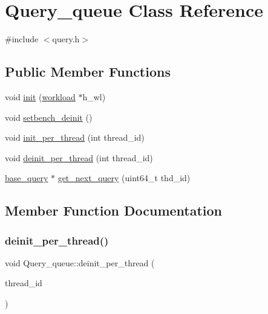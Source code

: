 \hypertarget{classQuery__queue}{}\section{Query\+\_\+queue Class Reference}
\label{classQuery__queue}


{\ttfamily \#include $<$query.\+h$>$}

\subsection*{Public Member Functions}
\begin{DoxyCompactItemize}
\item 
void \hyperlink{classQuery__queue_a7b11f8dff9c71abbf96d85328001803d}{init} (\hyperlink{classworkload}{workload} $\ast$h\+\_\+wl)
\item 
void \hyperlink{classQuery__queue_a3a8dbf987f4aac6af22083227cb30dac}{setbench\+\_\+deinit} ()
\item 
void \hyperlink{classQuery__queue_acad0797f9688fbada3f0c4748f95e2dc}{init\+\_\+per\+\_\+thread} (int thread\+\_\+id)
\item 
void \hyperlink{classQuery__queue_a3f657d30e7e04d7877e6b436aff26f38}{deinit\+\_\+per\+\_\+thread} (int thread\+\_\+id)
\item 
\hyperlink{classbase__query}{base\+\_\+query} $\ast$ \hyperlink{classQuery__queue_ac68f34bc81dc3919b5552724f82120a2}{get\+\_\+next\+\_\+query} (uint64\+\_\+t thd\+\_\+id)
\end{DoxyCompactItemize}


\subsection{Member Function Documentation}
\mbox{\label{classQuery__queue_a3f657d30e7e04d7877e6b436aff26f38}} 
\subsubsection{\texorpdfstring{deinit\+\_\+per\+\_\+thread()}{deinit\_per\_thread()}}
{\footnotesize\ttfamily void Query\+\_\+queue\+::deinit\+\_\+per\+\_\+thread (\begin{DoxyParamCaption}\item[{int}]{thread\+\_\+id }\end{DoxyParamCaption})}

